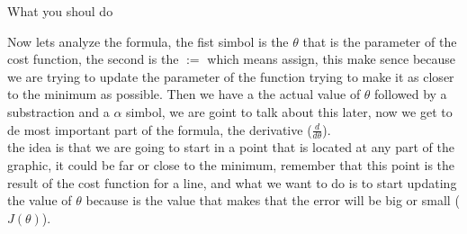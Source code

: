 \documentclass[12pt,journal]{IEEEtran}
\begin{document}
    \begin{figure}[h]
        \centering
    \end{figure}

    What you shoul do

    Now lets analyze the formula, the fist simbol is the $\theta$ that is the
    parameter of the cost function, the second is the $:=$ which means assign,
    this make sence because we are trying to update the parameter of the
    function trying to make it as closer to the minimum as possible. Then we
    have a the actual value of $\theta$ followed by a substraction and a
    $\alpha$ simbol, we are goint to talk about this later, now we get to de
    most important part of the formula, the derivative ($\frac{d}{d \theta}$).\\

    the idea is that we are going to start in a point that is located at any
    part of the graphic, it could be far or close to the minimum, remember that
    this point is the result of the cost function for a line, and what we want
    to do is to start updating the value of $\theta$ because is the value that
    makes that the error will be big or small ($J(\theta)$).\\
\end{document}
